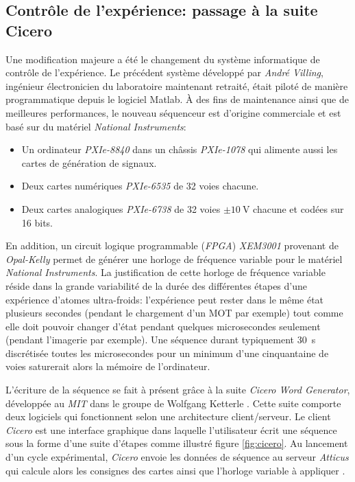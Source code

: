 \subsection{Contrôle de l'expérience: passage à la suite Cicero}
\label{sc:cicero}
Une modification majeure a été le changement du système informatique de contrôle de l'expérience. Le précédent système développé par \emph{André Villing}, ingénieur électronicien du laboratoire maintenant retraité, était piloté de manière programmatique depuis le logiciel Matlab. À des fins de maintenance ainsi que de meilleures performances, le nouveau séquenceur est d'origine commerciale et est basé sur du matériel \emph{National Instruments}:
\begin{itemize}
\item[\textendash] Un ordinateur \emph{PXIe-8840} dans un châssis \emph{PXIe-1078} qui alimente aussi les cartes de génération de signaux.
\item[\textendash] Deux cartes numériques \emph{PXIe-6535} de 32 voies chacune.
\item[\textendash] Deux cartes analogiques \emph{PXIe-6738} de 32 voies $\pm \SI{10}{\volt}$ chacune et codées sur 16 bits.
\end{itemize}
En addition, un circuit logique programmable (\emph{FPGA}) \emph{XEM3001} provenant de \emph{Opal-Kelly} permet de générer une horloge de fréquence variable pour le matériel \emph{National Instruments}. La justification de cette horloge de fréquence variable réside dans la grande variabilité de la durée des différentes étapes d'une expérience d'atomes ultra-froids: l'expérience peut rester dans le même état plusieurs secondes (pendant le chargement d'un MOT par exemple) tout comme elle doit pouvoir changer d'état pendant quelques microsecondes seulement (pendant l'imagerie par exemple). Une séquence durant typiquement \SI{30}{\second} discrétisée toutes les microsecondes pour un minimum d'une cinquantaine de voies saturerait alors la mémoire de l'ordinateur. 

L'écriture de la séquence se fait à présent grâce à la suite \emph{Cicero Word Generator}, développée au \emph{MIT} dans le groupe de Wolfgang Ketterle \citep{keshet2013distributed}. Cette suite comporte deux logiciels qui fonctionnent selon une architecture client/serveur. Le client \emph{Cicero} est une interface graphique dans laquelle l'utilisateur écrit une séquence sous la forme d'une suite d'étapes comme illustré figure \ref{fig:cicero}. Au lancement d'un cycle expérimental, \emph{Cicero} envoie les données de séquence au serveur \emph{Atticus} qui calcule alors les consignes des cartes ainsi que l'horloge variable à appliquer \citep{keshet2008cicero}.



